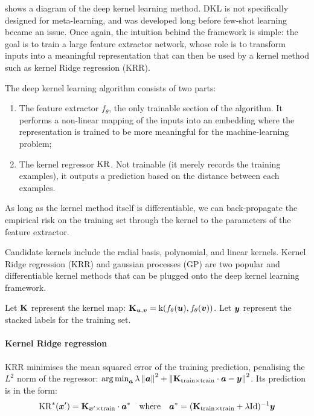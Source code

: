 \documentclass[11pt]{article}
\numberwithin{equation}{subsection}
\begin{document}
 shows a diagram of the deep kernel learning method. DKL is not specifically designed for meta-learning, and was developed long before few-shot learning became an issue. Once again, the intuition behind the framework is simple: the goal is to train a large feature extractor network, whose role is to transform inputs into a meaningful representation that can then be used by a kernel method such as kernel Ridge regression (KRR).

\clearpage
The deep kernel learning algorithm consists of two parts:
\begin{enumerate}
  \item The feature extractor $f_\theta$, the only trainable section of the algorithm. It performs a non-linear mapping of the inputs into an embedding where the representation is trained to be more meaningful for the machine-learning problem;
  \item The kernel regressor $\mathrm{KR}$. Not trainable (it merely records the training examples), it outputs a prediction based on the distance between each examples.
\end{enumerate}
As long as the kernel method itself is differentiable, we can back-propagate the empirical risk on the training set through the kernel to the parameters of the feature extractor.

Candidate kernels include the radial basis, polynomial, and linear kernels. Kernel Ridge regression (KRR) and gaussian processes (GP) are two popular and differentiable kernel methods that can be plugged onto the deep kernel learning framework.

Let $\mathbf{K}$ represent the kernel map: $\mathbf{K}_{{\bm{u}}, {\bm{v}}} = \mathrm{k}(f_\theta({\bm{u}}), f_\theta({\bm{v}}))$. Let ${\bm{y}}$ represent the stacked labels for the training set.

\paragraph{Kernel Ridge regression} KRR minimises the mean squared error of the training prediction, penalising the $L^2$ norm of the regressor: $\operatorname*{arg\,min}_{{\bm{a}}} \lambda \left\lVert{\bm{a}}\right\rVert^2 + \left\lVert\mathbf{K}_{\mathrm{train} \times \mathrm{train}} \cdot {\bm{a}} - {\bm{y}}\right\rVert^2$. Its prediction is in the form:
\begin{equation*}
  \mathrm{KR}^*({\bm{x}}') = \mathbf{K}_{{\bm{x}}' \times \mathrm{train}} \cdot {\bm{a}}^* \quad \text{where} \quad {\bm{a}}^* = (\mathbf{K}_{\mathrm{train} \times \mathrm{train}} + \lambda \bm{\textrm{Id}})^{-1} {\bm{y}}
\end{equation*}
\end{document}
